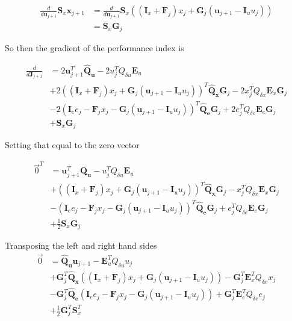 \documentclass[landscape]{article}
\begin{document}
\begin{align}
\frac{d}{d\mathbf{u}_{j+1}} \mathbf{S}_x \mathbf{x}_{j+1} 
& = \frac{d}{d\mathbf{u}_{j+1}} \mathbf{S}_x \left(\left(\mathbf{I}_x +\mathbf{F}_j \right)x_j + \mathbf{G}_j \left(\mathbf{u}_{j+1} - \mathbf{I}_u u_j \right)\right)\\
& =  \mathbf{S}_x  \mathbf{G}_j
\end{align}

So then the gradient of the performance index is

\begin{align}
\frac{d}{d\mathbf{J}_{j+1}} 
& = 2 \mathbf{u}_{j+1}^T \mathbf{\hat{Q}_u} - 2u_j^T Q_{\delta u} \mathbf{E}_u\\
& + 2 \left( \left(\mathbf{I}_x +\mathbf{F}_j \right)x_j + \mathbf{G}_j \left(\mathbf{u}_{j+1} - \mathbf{I}_u u_j \right) \right)^T \mathbf{\hat{Q}_x}\mathbf{G}_j  - 2x_j^T Q_{\delta x} \mathbf{E}_x \mathbf{G}_j\\
& - 2  \left( \mathbf{I}_e e_j -\mathbf{F}_j x_j - \mathbf{G}_j \left(\mathbf{u}_{j+1} - \mathbf{I}_uu_j \right)\right)^T \mathbf{\hat{Q}_e} \mathbf{G}_j  + 2e_j^T Q_{\delta e} \mathbf{E}_e \mathbf{G}_j\\
& + \mathbf{S}_x  \mathbf{G}_j
\end{align}

Setting that equal to the zero vector

\begin{align}
\vec{0}^T 
& =  \mathbf{u}_{j+1}^T \mathbf{\hat{Q}_u} - u_j^T Q_{\delta u} \mathbf{E}_u\\
& +  \left( \left(\mathbf{I}_x +\mathbf{F}_j \right)x_j + \mathbf{G}_j \left(\mathbf{u}_{j+1} - \mathbf{I}_u u_j \right) \right)^T \mathbf{\hat{Q}_x}\mathbf{G}_j  - x_j^T Q_{\delta x} \mathbf{E}_x \mathbf{G}_j\\
& -   \left( \mathbf{I}_e e_j -\mathbf{F}_j x_j - \mathbf{G}_j \left(\mathbf{u}_{j+1} - \mathbf{I}_uu_j \right)\right)^T \mathbf{\hat{Q}_e} \mathbf{G}_j  + e_j^T Q_{\delta e} \mathbf{E}_e \mathbf{G}_j\\
& + \frac{1}{2}\mathbf{S}_x  \mathbf{G}_j
\end{align}

Transposing the left and right hand sides
\begin{align}
\vec{0}
& =  \mathbf{\hat{Q}_u} \mathbf{u}_{j+1} -  \mathbf{E}_u^T Q_{\delta u} u_j\\
& +  \mathbf{G}_j^T \mathbf{\hat{Q}_x} \left( \left(\mathbf{I}_x +\mathbf{F}_j \right)x_j + \mathbf{G}_j \left(\mathbf{u}_{j+1} - \mathbf{I}_u u_j \right) \right)  -   \mathbf{G}_j^T \mathbf{E}_x^T Q_{\delta x} x_j\\
& -  \mathbf{G}_j^T \mathbf{\hat{Q}_e} \left( \mathbf{I}_e e_j -\mathbf{F}_j x_j - \mathbf{G}_j \left(\mathbf{u}_{j+1} - \mathbf{I}_uu_j \right)\right)  +   \mathbf{G}_j^T \mathbf{E}_e^T Q_{\delta e} e_j\\
& + \frac{1}{2} \mathbf{G}_j^T \mathbf{S}_x^T
\end{align}
\end{document}
